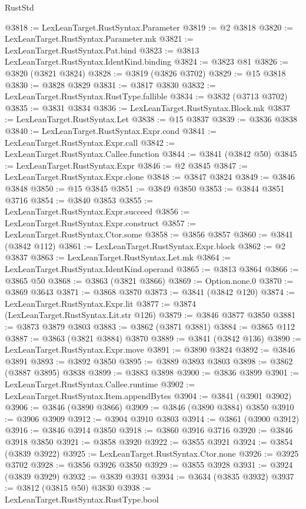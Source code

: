 \begin{lexlean}{RustStd}
\begin{coremodule}
@3818 := LexLeanTarget.RustSyntax.Parameter
@3819 := @2 @3818
@3820 := LexLeanTarget.RustSyntax.Parameter.mk
@3821 := LexLeanTarget.RustSyntax.Pat.bind
@3823 := @3813 LexLeanTarget.RustSyntax.IdentKind.binding
@3824 := @3823 @81
@3826 := @3820 (@3821 @3824)
@3828 := @3819 (@3826 @3702)
@3829 := @15 @3818
@3830 := @3828 @3829
@3831 := @3817 @3830
@3832 := LexLeanTarget.RustSyntax.RustType.fallible
@3834 := @3832 (@3713 @3702)
@3835 := @3831 @3834
@3836 := LexLeanTarget.RustSyntax.Block.mk
@3837 := LexLeanTarget.RustSyntax.Let
@3838 := @15 @3837
@3839 := @3836 @3838
@3840 := LexLeanTarget.RustSyntax.Expr.cond
@3841 := LexLeanTarget.RustSyntax.Expr.call
@3842 := LexLeanTarget.RustSyntax.Callee.function
@3844 := @3841 (@3842 @50)
@3845 := LexLeanTarget.RustSyntax.Expr
@3846 := @2 @3845
@3847 := LexLeanTarget.RustSyntax.Expr.clone
@3848 := @3847 @3824
@3849 := @3846 @3848
@3850 := @15 @3845
@3851 := @3849 @3850
@3853 := @3844 @3851 @3716
@3854 := @3840 @3853
@3855 := LexLeanTarget.RustSyntax.Expr.succeed
@3856 := LexLeanTarget.RustSyntax.Expr.construct
@3857 := LexLeanTarget.RustSyntax.Ctor.some
@3858 := @3856 @3857
@3860 := @3841 (@3842 @112)
@3861 := LexLeanTarget.RustSyntax.Expr.block
@3862 := @2 @3837
@3863 := LexLeanTarget.RustSyntax.Let.mk
@3864 := LexLeanTarget.RustSyntax.IdentKind.operand
@3865 := @3813 @3864
@3866 := @3865 @50
@3868 := @3863 (@3821 @3866)
@3869 := Option.none.{0}
@3870 := @3869 @3643
@3871 := @3868 @3870
@3873 := @3841 (@3842 @120)
@3874 := LexLeanTarget.RustSyntax.Expr.lit
@3877 := @3874 (LexLeanTarget.RustSyntax.Lit.str @126)
@3879 := @3846 @3877 @3850
@3881 := @3873 @3879 @3803
@3883 := @3862 (@3871 @3881)
@3884 := @3865 @112
@3887 := @3863 (@3821 @3884) @3870
@3889 := @3841 (@3842 @136)
@3890 := LexLeanTarget.RustSyntax.Expr.move
@3891 := @3890 @3824
@3892 := @3846 @3891
@3893 := @3892 @3850
@3895 := @3889 @3893 @3803
@3898 := @3862 (@3887 @3895) @3838
@3899 := @3883 @3898
@3900 := @3836 @3899
@3901 := LexLeanTarget.RustSyntax.Callee.runtime
@3902 := LexLeanTarget.RustSyntax.Item.appendBytes
@3904 := @3841 (@3901 @3902)
@3906 := @3846 (@3890 @3866)
@3909 := @3846 (@3890 @3884) @3850
@3910 := @3906 @3909
@3912 := @3904 @3910 @3803
@3914 := @3861 (@3900 @3912)
@3916 := @3846 @3914 @3850
@3918 := @3860 @3916 @3716
@3920 := @3846 @3918 @3850
@3921 := @3858 @3920
@3922 := @3855 @3921
@3924 := @3854 (@3839 @3922)
@3925 := LexLeanTarget.RustSyntax.Ctor.none
@3926 := @3925 @3702
@3928 := @3856 @3926 @3850
@3929 := @3855 @3928
@3931 := @3924 (@3839 @3929)
@3932 := @3839 @3931
@3934 := @3634 (@3835 @3932)
@3937 := @3812 (@3815 @50) @3830
@3938 := LexLeanTarget.RustSyntax.RustType.bool

\end{coremodule}
\end{lexlean}
